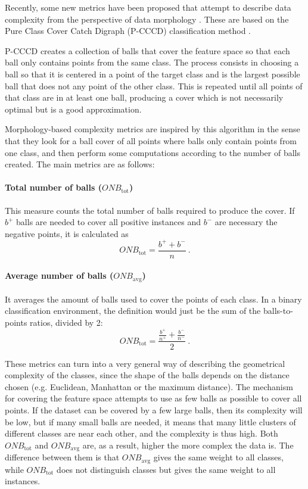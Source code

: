 Recently, some new metrics have been proposed that attempt to describe data complexity from the perspective of data morphology . These are based on the Pure Class Cover Catch Digraph (P-CCCD) classification method .

P-CCCD creates a collection of balls that cover the feature space so that each ball only contains points from the same class. The process consists in choosing a ball so that it is centered in a point of the target class and is the largest possible ball that does not any point of the other class. This is repeated until all points of that class are in at least one ball, producing a cover which is not necessarily optimal but is a good approximation.

Morphology-based complexity metrics are inspired by this algorithm in the sense that they look for a ball cover of all points where balls only contain points from one class, and then perform some computations according to the number of balls created. The main metrics are as follows:

\paragraph*{Total number of balls ($\textit{ONB}_{\text{tot}}$)} This measure counts the total number of balls required to produce the cover. If $b^+$ balls are needed to cover all positive instances and $b^-$ are necessary  the negative points, it is calculated as \begin{equation}\textit{ONB}_{\text{tot}}=\frac{b^++b^-}{n}~.\end{equation}
\paragraph*{Average number of balls ($\textit{ONB}_{\text{avg}}$)}  It averages the amount of balls used to cover the points of each class. In a binary classification environment, the definition would just be the sum of the balls-to-points ratios, divided by 2: \begin{equation}\textit{ONB}_{\text{tot}}=\frac{\frac{b^+}{n^+}+\frac{b^-}{n^-}}{2}~.\end{equation}


These metrics can turn into a very general way of describing the geometrical complexity of the classes, since the shape of the balls depends on the distance chosen (e.g. Euclidean, Manhattan or the maximum distance). The mechanism for covering the feature space attempts to use as few balls as possible to cover all points. If the dataset can be covered by a few large balls, then its complexity will be low, but if many small balls are needed, it means that many little clusters of different classes are near each other, and the complexity is thus high. Both $\textit{ONB}_{\text{tot}}$ and $\textit{ONB}_{\text{avg}}$ are, as a result, higher the more complex the data is. The difference between them is that $\textit{ONB}_{\text{avg}}$ gives the same weight to all classes, while $\textit{ONB}_{\text{tot}}$ does not distinguish classes but gives the same weight to all instances.



